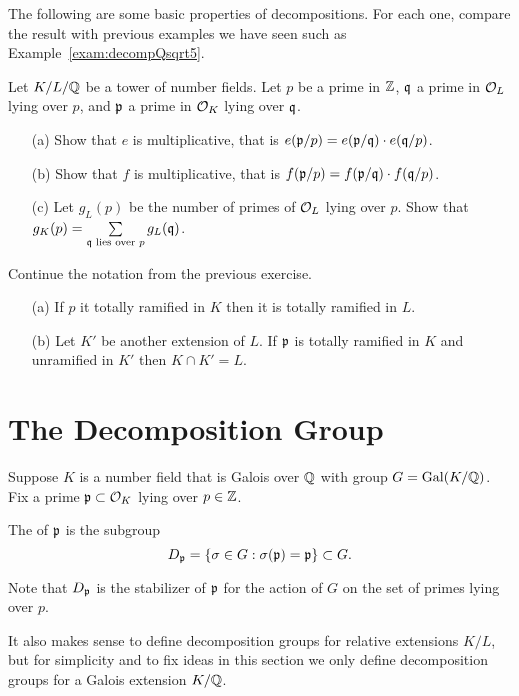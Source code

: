 \begin{exercise}\label{ex:ramificationmultiplicative}
The following are some basic properties of decompositions.
For each one, compare the result with previous examples
we have seen such as Example~\ref{exam:decompQsqrt5}.

Let $K/L/\mathbb{Q}$ be a tower of number fields. Let $p$ be a prime
in $\mathbb{Z}$, $\mathfrak{q}$ a prime in $\mathcal{O}_L$ lying over $p$, and $\mathfrak{p}$ a prime
in $\mathcal{O}_K$ lying over $\mathfrak{q}$.
\begin{enumerate}
	\item[(a)] Show that $e$ is multiplicative, that is $e(\mathfrak{p}/p)=e(\mathfrak{p}/\mathfrak{q}) \cdot e(\mathfrak{q}/p)$.
	\item[(b)] Show that $f$ is multiplicative, that is $f(\mathfrak{p}/p)=f(\mathfrak{p}/\mathfrak{q}) \cdot f(\mathfrak{q}/p)$.
	\item[(c)] Let $g_L(p)$ be the number of primes of $\mathcal{O}_L$ lying over $p$.
	Show that $g_K(p) = \sum\limits_{\mathfrak{q} \text{ lies over } p} g_L(\mathfrak{q})$.
\end{enumerate}
\end{exercise}

\begin{exercise}
Continue the notation from the previous exercise.
\begin{enumerate}
	\item[(a)]
	If $p$ it totally ramified in $K$
	then it is totally ramified in $L$.

	\item[(b)]
	Let $K'$ be another extension of $L$.
	If $\mathfrak{p}$ is totally ramified in $K$ and unramified in $K'$
	then $K\cap K' = L$.
\end{enumerate}

\end{exercise}

\section{The Decomposition Group}
Suppose $K$ is a number field that is Galois over $\mathbb{Q}$ with
group $G=\operatorname{Gal}(K/\mathbb{Q})$.
Fix a prime $\mathfrak{p}\subset \mathcal{O}_K$ lying over $p\in\mathbb{Z}$.
\begin{definition}\label{def:decomp}
The  of $\mathfrak{p}$ is the subgroup
$$
  D_{\mathfrak{p}} = \{\sigma \in G : \sigma(\mathfrak{p})=\mathfrak{p}\} \subset G.
$$
\end{definition}
Note that $D_{\mathfrak{p}}$ is the stabilizer of $\mathfrak{p}$ for
the action of $G$ on the set of primes lying over $p$.

It also makes sense to define decomposition groups for relative
extensions $K/L$, but for simplicity and to fix ideas in this section
we only define decomposition groups for a Galois extension $K/\mathbb{Q}$.

